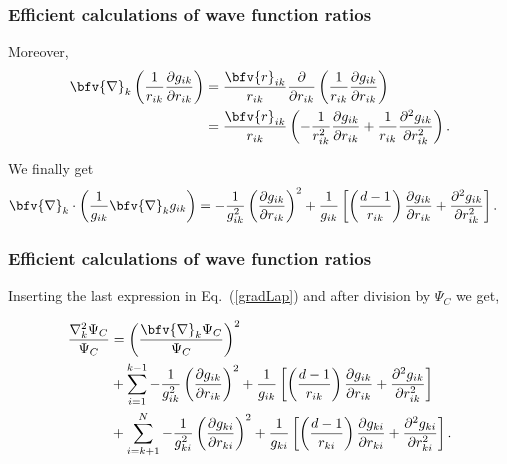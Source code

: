 \frame
 {
   \frametitle{Efficient calculations of wave function ratios}
 \begin{small}
 {\scriptsize

Moreover, 
\begin{align*}
\bfv{\nabla}_k \left(\frac{1}{r_{ik}}\frac{\partial g_{ik}}{\partial r_{ik}}\right) &= \frac{\bfv{r}_{ik}}{r_{ik}} \frac{\partial }{\partial r_{ik}} \left(\frac{1}{r_{ik}}\frac{\partial g_{ik}}{\partial r_{ik}}\right)\nonumber\\
&=\frac{\bfv{r}_{ik}}{r_{ik}}\left(-\frac{1}{r_{ik}^2}\frac{\partial g_{ik}}{\partial r_{ik}} + \frac{1}{r_{ik}}\frac{\partial^2 g_{ik}}{\partial r_{ik}^2}\right).\label{subs1}
\end{align*}

We finally get
\begin{align*}
  \bfv{\nabla}_k \cdot \left(\frac{1}{g_{ik}}\bfv{\nabla}_k g_{ik}\right) &= -\frac{1}{g_{ik}^2}\left(\frac{\partial g_{ik}}{\partial r_{ik}}\right)^2 + \frac{1}{g_{ik}}\left[\left(\frac{d-1}{r_{ik}}\right)\frac{\partial g_{ik}}{\partial r_{ik}} + \frac{\partial^2 g_{ik}}{\partial r_{ik}^2} \right].
\end{align*}
 }
 \end{small}
 }
\frame
 {
   \frametitle{Efficient calculations of wave function ratios}
 \begin{small}
 {\scriptsize

Inserting the last expression in Eq.~(\ref{gradLap}) and after division by $\Psi_C$ we get,

\begin{align}
 \frac{\nabla_{k}^2 \Psi_C}{\Psi_C} & =  \left(\frac{\bfv{\nabla}_k \Psi_C}{\Psi_C}\right)^2 \nonumber\\
 & + \sum_{i=1}^{k-1} -\frac{1}{g_{ik}^2}\left(\frac{\partial g_{ik}}{\partial r_{ik}}\right)^2 + \frac{1}{g_{ik}}\left[\left(\frac{d-1}{r_{ik}}\right)\frac{\partial g_{ik}}{\partial r_{ik}} + \frac{\partial^2 g_{ik}}{\partial r_{ik}^2} \right]\nonumber\\
 & + \sum_{i=k+1}^{N} -\frac{1}{g_{ki}^2}\left(\frac{\partial g_{ki}}{\partial r_{ki}}\right)^2 + \frac{1}{g_{ki}}\left[\left(\frac{d-1}{r_{ki}}\right)\frac{\partial g_{ki}}{\partial r_{ki}} + \frac{\partial^2 g_{ki}}{\partial r_{ki}^2} \right].
\end{align}
 }
 \end{small}
 }
\frame
